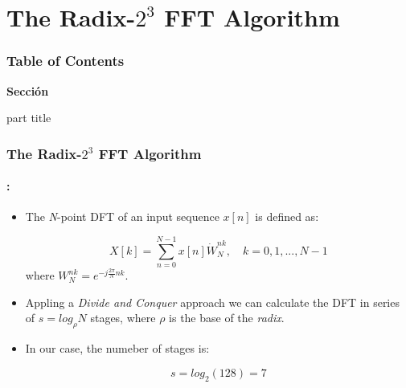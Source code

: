 \section{The Radix-$2^3$ FFT  Algorithm}
\begin{frame}
  \frametitle{\textbf{Table of Contents}}
  \begin{center}
    {\vspace{-1.5cm}\Large \textbf{Sección \thesection}\vspace{0.5cm}}
    \begin{beamercolorbox}[
      sep=8pt,center]{part title}
      \textbf{\insertsection}
    \end{beamercolorbox}
  \end{center}
\end{frame}

\begin{frame}
	\frametitle{\textbf{The Radix-$2^3$ FFT  Algorithm}}
	\framesubtitle{\secname : \subsecname}
	\begin{block}{\centering}
		\begin{itemize} %
			\item The \textit{N}-point DFT of an input sequence $x[n]$ is defined as:

				\begin{equation}
					X[k] = \sum_{n=0}^{N-1} x[n] \dot W_N^{nk}, \quad k=0,1,...,N-1
				\end{equation}
					where $W_N^{nk} = e^{-j\frac{2\pi}{N} nk}$. 
		 	\item Appling a \textit{Divide and Conquer} approach we can calculate the DFT in series of $s=log_\rho N$ stages, where $\rho$ is the base of the 			\textit{radix}. 
		 	
		 	\item In our case, the numeber of stages is:
		 	
		 		\begin{equation}
		 			s = log_2 (128) = 7 
		 		\end{equation}
		     	    	
    	\end{itemize}
    \end{block}
\end{frame}


